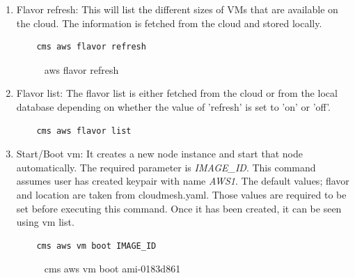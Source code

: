 \documentclass[9pt,twocolumn,twoside]{../../styles/osajnl}
\begin{document}
\begin{enumerate}
    \item Flavor refresh: This will list the different sizes of VMs
      that are available on the cloud. The information is fetched from
      the cloud and stored locally.
	
	\begin{verbatim}
    cms aws flavor refresh
	\end{verbatim}
		
	\begin{figure}[h!]
		\centering
		\caption{aws flavor refresh }
		\label{fig:flavorlist}
	\end{figure}
	
\item Flavor list: The flavor list is either fetched from the
      cloud or from the local database depending on whether the
      value of 'refresh' is set to 'on' or 'off'.
	
	\begin{verbatim}
    cms aws flavor list
	\end{verbatim}
	
\item Start/Boot vm: It creates a new node instance and start that
  node automatically. The required parameter is
  \textit{IMAGE\_ID}. This command assumes user has created keypair
  with name \textit{AWS1}. The default values; flavor and location are
  taken from cloudmesh.yaml. Those values are required to be set
  before executing this command. Once it has been created, it can be
  seen using vm list.
    
    \begin{verbatim}
    cms aws vm boot IMAGE_ID
    \end{verbatim}
    
   	\begin{figure}[h!]
	   	\centering
	   	\caption{cms aws vm boot ami-0183d861 }
	   	\label{fig:vmboot}
    \end{figure}


\end{enumerate}
\end{document}
